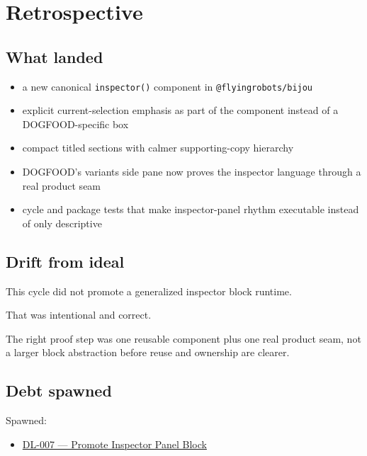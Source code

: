 \section{Retrospective}\label{record-173-retrospective}

\subsection{What landed}\label{record-173-what-landed}

\begin{itemize}
\tightlist
\item
  a new canonical \texttt{i\allowbreak{}n\allowbreak{}s\allowbreak{}p\allowbreak{}e\allowbreak{}c\allowbreak{}t\allowbreak{}o\allowbreak{}r\allowbreak{}(\allowbreak{})} component in \texttt{@\allowbreak{}f\allowbreak{}l\allowbreak{}y\allowbreak{}i\allowbreak{}n\allowbreak{}g\allowbreak{}r\allowbreak{}o\allowbreak{}b\allowbreak{}o\allowbreak{}t\allowbreak{}s\allowbreak{}/\allowbreak{}b\allowbreak{}i\allowbreak{}j\allowbreak{}o\allowbreak{}u}
\item
  explicit current-selection emphasis as part of the component instead of a DOGFOOD-specific box
\item
  compact titled sections with calmer supporting-copy hierarchy
\item
  DOGFOOD's variants side pane now proves the inspector language through a real product seam
\item
  cycle and package tests that make inspector-panel rhythm executable instead of only descriptive
\end{itemize}

\subsection{Drift from ideal}\label{record-173-drift-from-ideal}

This cycle did not promote a generalized inspector block runtime.

That was intentional and correct.

The right proof step was one reusable component plus one real product seam, not a larger block abstraction before reuse and ownership are clearer.

\subsection{Debt spawned}\label{record-173-debt-spawned}

Spawned:

\begin{itemize}
\tightlist
\item
  \href{https://github.com/flyingrobots/bijou/blob/cbd70612140e7a450d764b3c7be1c6af878b99bc/docs/method/graveyard/legacy-backlog/DL-007-promote-inspector-panel-block.md}{DL-007 --- Promote Inspector Panel Block}
\end{itemize}

